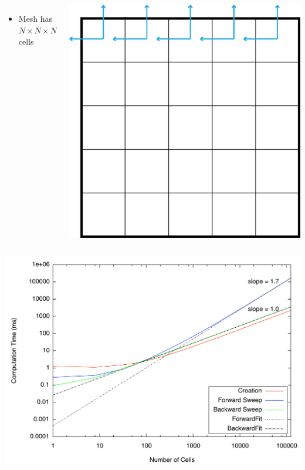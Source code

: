 \documentclass{beamer}
\begin{document}
\begin{frame}
\begin{columns}[c]
\begin{itemize}
    \item Mesh has $N\times N \times N$ cells
\end{itemize}

    \includegraphics[width=\textwidth, keepaspectratio]{BackwardSweep}
\end{columns}
\end{frame}

\begin{frame}
    \includegraphics[width=\textwidth, keepaspectratio]{MeshTiming}
\end{frame}
\end{document}
